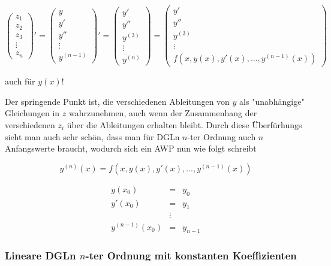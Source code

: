\documentclass[10pt,a4paper]{article}
\begin{document}
\begin{equation}
\begin{pmatrix}
z_1 \\ z_2 \\ z_3 \\ \vdots \\ z_n
\end{pmatrix}'=
\begin{pmatrix}
y \\ y' \\ y'' \\ \vdots \\ y^{(n-1)}
\end{pmatrix}'=
\begin{pmatrix}
y' \\ y'' \\ y^{(3)} \\ \vdots \\ y^{(n)}
\end{pmatrix}=
\begin{pmatrix}
y' \\ y'' \\ y^{(3)} \\ \vdots \\ f(x,y(x),y'(x),...,y^{(n-1)}(x))
\end{pmatrix}
\end{equation}

auch für $y(x)$!

Der springende Punkt ist, die verschiedenen Ableitungen von $y$ als "unabhängige" Gleichungen in $z$ wahrzunehmen, auch wenn der Zusammenhang der verschiedenen $z_i$ über die Ableitungen erhalten bleibt. Durch diese Überfürhungs sieht man auch sehr schön, dass man für DGLn $n$-ter Ordnung auch $n$ Anfangswerte braucht, wodurch sich ein AWP nun wie folgt schreibt

\begin{defi}
\begin{equation}
y^{(n)}(x)=f(x,y(x),y'(x),...,y^{(n-1)}(x))
\end{equation}

\begin{eqnarray*}
y(x_0)&=&y_0\\
y'(x_0)&=&y_1\\
&\vdots&\\
y^{(n-1)}(x_0)&=&y_{n-1}
\end{eqnarray*}

\end{defi}

\subsubsection{Lineare DGLn $n$-ter Ordnung mit konstanten Koeffizienten}
\end{document}
